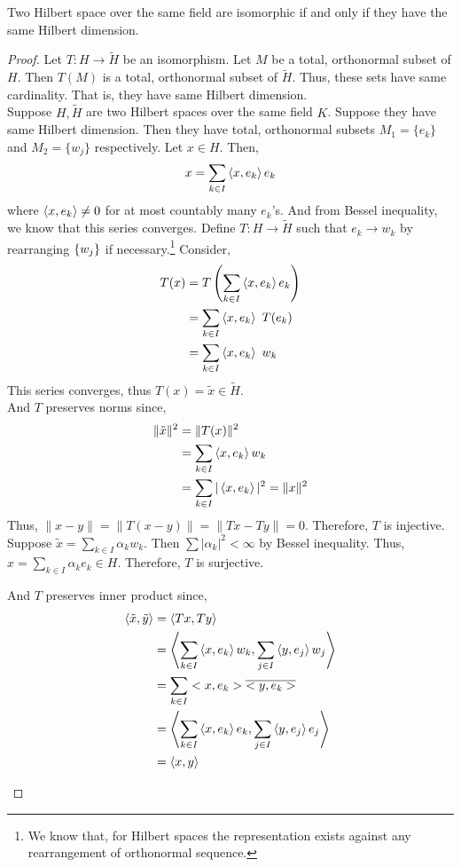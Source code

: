 \begin{theorem}
	Two Hilbert space over the same field are isomorphic if and only if they have the same Hilbert dimension.
\end{theorem}
\begin{proof}
	Let $T : H \to \tilde{H}$ be an isomorphism.
	Let $M$ be a total, orthonormal subset of $H$.
	Then $T(M)$ is a total, orthonormal subset of $\tilde{H}$.
	Thus, these sets have same cardinality.
	That is, they have same Hilbert dimension. \\

	Suppose $H,\tilde{H}$ are two Hilbert spaces over the same field $K$.
	Suppose they have same Hilbert dimension.
	Then they have total, orthonormal subsets $M_1 = \{ e_k \}$ and $M_2 = \{ w_j \}$ respectively.
	Let $x \in H$.
	Then,
	\[ x = \sum_{k \in I} \left\langle x,e_k \right\rangle e_k \]
	where $\left\langle x,e_k \right\rangle \ne 0$ for at most countably many $e_k$'s.
	And from Bessel inequality, we know that this series converges.
	Define $T : H \to \tilde{H}$ such that $e_k \to w_k$ by rearranging $\left\{w_j\right\}$ if necessary.\dag\footnote{
		We know that, for Hilbert spaces the representation exists against any rearrangement of orthonormal sequence.}
	Consider,
	\begin{align*}
		T(x) 
		& = T\left( \sum_{k \in I} \left\langle x,e_k \right\rangle e_k \right) \\
		& = \sum_{k \in I} \left\langle x,e_k \right\rangle \ T(e_k) \\
		& = \sum_{k \in I} \left\langle x,e_k \right\rangle \ w_k 
	\end{align*}
	This series converges, thus $T(x) = \tilde{x} \in \tilde{H}$.\\

	And $T$ preserves norms since,
	\begin{align*}
		\|\tilde{x}\|^2
		& = \|T(x)\|^2 \\
		& = \sum_{k \in I} \left\langle x,e_k \right\rangle w_k \\
		& = \sum_{k \in I} |\left\langle x,e_k \right\rangle|^2 = \|x\|^2
	\end{align*}
	Thus, $\|x-y\| = \|T(x-y)\| = \|Tx-Ty\| = 0$.
	Therefore, $T$ is injective.\\

	Suppose $\displaystyle \tilde{x} = \sum_{k \in I} \alpha_k w_k$.
	Then $\sum |\alpha_k|^2 < \infty$ by Bessel inequality.
	Thus, $\displaystyle x = \sum_{k \in I} \alpha_k e_k \in H$.
	Therefore, $T$ is surjective.\\

	\begin{commentary}
	And $T$ preserves inner product since,
	\begin{align*}
		\left\langle \tilde{x},\tilde{y} \right\rangle 
		& = \left\langle Tx,Ty \right\rangle \\
		& = \left\langle \sum_{k \in I} \left\langle x,e_k \right\rangle w_k,\sum_{j \in I} \left\langle y,e_j \right\rangle w_j \right\rangle \\
		& = \sum_{k \in I} <x,e_k>\overline{<y,e_k>} \\
		& = \left\langle \sum_{k \in I} \left\langle x,e_k \right\rangle e_k,\sum_{j \in I} \left\langle y,e_j \right\rangle e_j \right\rangle \\
		& = \left\langle x,y \right\rangle
	\end{align*}
	\end{commentary}
\end{proof}

